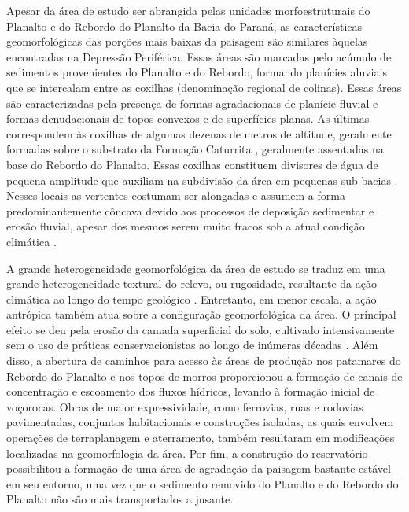 Apesar da área de estudo ser abrangida pelas unidades morfoestruturais do Planalto e do Rebordo do Planalto
da Bacia do Paraná, as características geomorfológicas das porções mais baixas da paisagem são similares 
àquelas encontradas na Depressão Periférica. Essas áreas são marcadas pelo acúmulo de sedimentos provenientes 
do Planalto e do Rebordo, formando planícies aluviais que se intercalam entre as coxilhas (denominação 
regional de colinas). Essas áreas são caracterizadas pela presença de formas agradacionais de planície fluvial 
e formas denudacionais de topos convexos e de superfícies planas. As últimas correspondem às coxilhas de 
algumas dezenas de metros de altitude, geralmente formadas sobre o substrato da Formação Caturrita 
\cite{GasparettoEtAl1988}, geralmente assentadas na base do Rebordo do Planalto. Essas coxilhas constituem 
divisores de água de pequena amplitude que auxiliam na subdivisão da área em pequenas sub-bacias 
\cite{Marins2004, Sartori2009}. Nesses locais as vertentes costumam ser alongadas e assumem a forma 
predominantemente côncava devido aos processos de deposição sedimentar e erosão fluvial, apesar dos mesmos 
serem muito fracos sob a atual condição climática 
\cite{NascimentoEtAl2010, WerlangEtAl2010}.

A grande heterogeneidade geomorfológica da área de estudo se traduz em uma grande heterogeneidade textural 
do relevo, ou rugosidade, resultante da ação climática ao longo do tempo geológico \cite{NascimentoEtAl2010}. 
Entretanto, em menor escala, a ação antrópica também atua sobre a configuração geomorfológica da área. O 
principal efeito se deu pela erosão da camada superficial do solo, cultivado intensivamente sem o uso de 
práticas conservacionistas ao longo de inúmeras décadas \cite{Menezes2008, Sturmer2008, Miguel2010, 
SamuelRosaEtAl2011a}. Além disso, a abertura de caminhos para acesso às áreas de produção nos patamares do 
Rebordo do Planalto e nos topos de morros proporcionou a formação de canais de concentração e escoamento dos 
fluxos hídricos, levando à formação inicial de voçorocas. Obras de maior expressividade, como ferrovias, ruas 
e rodovias pavimentadas, conjuntos habitacionais e construções isoladas, as quais envolvem operações de 
terraplanagem e aterramento, também resultaram em modificações localizadas na geomorfologia da área. Por fim, 
a construção do reservatório possibilitou a formação de uma área de agradação da paisagem bastante estável em 
seu entorno, uma vez que o sedimento removido do Planalto e do Rebordo do Planalto não são mais transportados 
a jusante.

